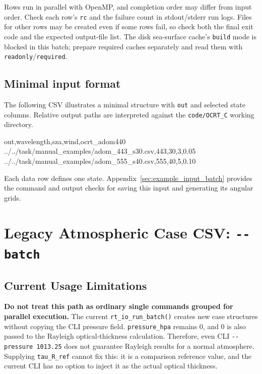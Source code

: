 Rows run in parallel with OpenMP, and completion order may differ from input order. Check each row's \texttt{rc} and the failure count in stdout/stderr run logs. Files for other rows may be created even if some rows fail, so check both the final exit code and the expected output-file list. The disk sea-surface cache's \texttt{build} mode is blocked in this batch; prepare required caches separately and read them with \texttt{readonly}/\texttt{required}.

\subsection{Minimal input format}
\label{sec:auto:08_input_formats:2.7}
\label{sec:input_batch_sample}
The following CSV illustrates a minimal structure with \texttt{out} and selected state columns. Relative output paths are interpreted against the \texttt{code/\allowbreak{}OCRT\_\allowbreak{}C} working directory.

\begin{ManualCode}
out,wavelength,sza,wind,ocrt_adom440
../../task/manual_examples/adom_443_s30.csv,443,30,3,0.05
../../task/manual_examples/adom_555_s40.csv,555,40,5,0.10
\end{ManualCode}

Each data row defines one state. Appendix~\ref{sec:example_input_batch} provides the command and output checks for saving this input and generating its angular grids.

\section{Legacy Atmospheric Case CSV: \texttt{-\allowbreak{}-\allowbreak{}batch}}
\label{sec:auto:08_input_formats:3}
\subsection{Current Usage Limitations}
\label{sec:auto:08_input_formats:3.1}
\textbf{Do not treat this path as ordinary single commands grouped for parallel execution.} The current \texttt{rt\_\allowbreak{}io\_\allowbreak{}run\_\allowbreak{}batch()} creates new case structures without copying the CLI pressure field. \texttt{pressure\_\allowbreak{}hpa} remains 0, and 0 is also passed to the Rayleigh optical-thickness calculation. Therefore, even CLI \texttt{-\allowbreak{}-\allowbreak{}pressure 1013.\allowbreak{}25} does not guarantee Rayleigh results for a normal atmosphere. Supplying \texttt{tau\_\allowbreak{}R\_\allowbreak{}ref} cannot fix this: it is a comparison reference value, and the current CLI has no option to inject it as the actual optical thickness.

